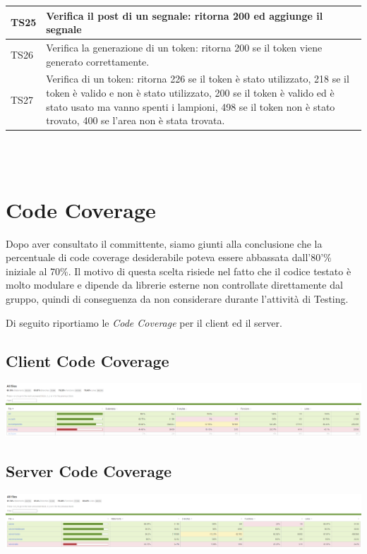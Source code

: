 \documentclass[a4paper, 12pt]{article}
\begin{document}
\begin{center}
\begin{tabularx}{\textwidth}{|X|X|}
		\hline
		TS25 & Verifica il post di un segnale: ritorna 200 ed aggiunge il segnale                                                                                                                                                                                                  \\
		\hline
		TS26 & Verifica la generazione di un token: ritorna 200 se il token viene generato correttamente.                                                                                                                                                                          \\
		\hline
		TS27 & Verifica di un token: ritorna 226 se il token è stato utilizzato, 218 se il token è valido e non è stato utilizzato, 200 se il token è valido ed è stato usato ma vanno spenti i lampioni, 498 se il token non è stato trovato,  400 se l'area non è stata trovata. \\
		\hline
	\end{tabularx}\\
	\mbox{}\\
\end{center}
\newpage
\section{Code Coverage}
Dopo aver consultato il committente, siamo giunti alla conclusione che la
percentuale di code coverage desiderabile poteva essere abbassata dall'80'\%
iniziale al 70\%. Il motivo di questa scelta risiede nel fatto che il codice
testato è molto modulare e dipende da librerie esterne non controllate
direttamente dal gruppo, quindi di conseguenza da non considerare durante l'attività di Testing.

Di seguito riportiamo le \textit{Code Coverage} per il client ed il server.

\subsection*{Client Code Coverage}
\begin{center}
	\includegraphics[scale=0.20]{client-coverage.png}
\end{center}
\subsection*{Server Code Coverage}
\begin{center}
	\includegraphics[scale=0.20]{server-coverage.png}
\end{center}
\end{document}
